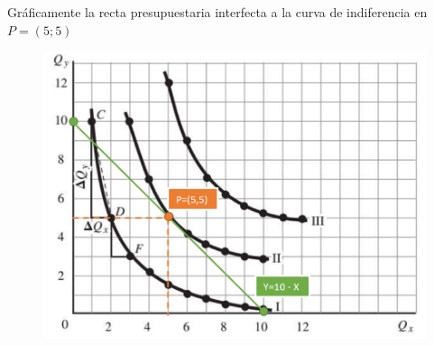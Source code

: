 \documentclass[letterpaper]{article}
\begin{document}
Gráficamente la recta presupuestaria interfecta a la curva de indiferencia en $P=(5;5)$

\begin{figure}[htbp]
\centering
\includegraphics[width=\textwidth]{Images/punto_8.png}
\end{figure}
\end{document}
